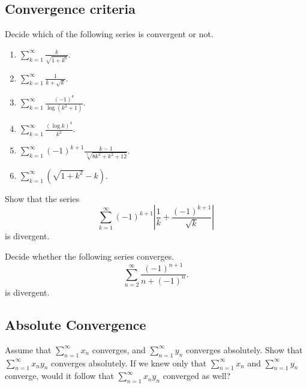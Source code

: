 \documentclass[10pt, a4paper]{article}
\newcommand{\infsum}[1][n = 1]{\sum_{#1}^{\infty}}
\begin{document}
\subsection{Convergence criteria}

\begin{example}
    Decide which of the following series is convergent or not.
    \begin{enumerate}[label = \alph*.]
        \item $\displaystyle \sum_{k = 1}^{\infty}\frac{k}{\sqrt{1 + k ^ 6}}.$
        \item $\displaystyle \sum_{k = 1}^{\infty}\frac{1}{k + \sqrt{k}}.$
        \item $\displaystyle \sum_{k = 1}^{\infty}\frac{(-1) ^ k}{\log{(k ^ 2 + 1)}}.$
        \item $\displaystyle \sum_{k = 1}^{\infty}\frac{(\log k) ^ 4}{k ^ 2}.$
        \item $\displaystyle \sum_{k = 1}^{\infty}(-1)^{k + 1}\frac{k - 1}{\sqrt[3]{8k ^ 3 + k ^ 2 + 12}}.$
        \item $\displaystyle \sum_{k = 1}^{\infty}\left(\sqrt{1 + k ^ 2} - k\right).$
    \end{enumerate}
\end{example}

\begin{example}
    Show that the series
    \[
    \sum_{k = 1}^{\infty} (-1)^{k + 1} \left|\frac{1}{k} + \frac{(-1) ^ {k + 1}}{\sqrt{k}}\right|
    \]
    is divergent.
\end{example}

\begin{example}
    Decide whether the following series converges.
    \[
    \sum_{n = 2}^{\infty} \frac{(-1)^{n + 1}}{n + (-1) ^ n}.
    \]
    is divergent.
\end{example}

\subsection{Absolute Convergence}

\begin{example}
    Assume that $\infsum x_n$ converges, and $\infsum y_n$ converges absolutely. Show that $\infsum x_ny_n$ converges absolutely. If we knew only that $\infsum x_n$ and $\infsum y_n$ converge, would it follow that $\infsum x_ny_n$ converged as well?
\end{example}
\end{document}
